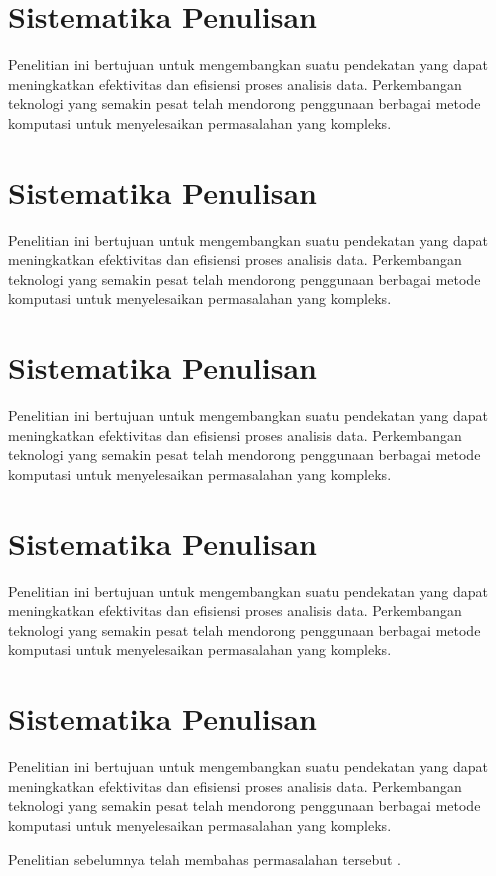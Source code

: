 \section{Sistematika Penulisan}
Penelitian ini bertujuan untuk mengembangkan suatu pendekatan yang dapat meningkatkan efektivitas dan efisiensi proses analisis data. Perkembangan teknologi yang semakin pesat telah mendorong penggunaan berbagai metode komputasi untuk menyelesaikan permasalahan yang kompleks.

\section{Sistematika Penulisan}
Penelitian ini bertujuan untuk mengembangkan suatu pendekatan yang dapat meningkatkan efektivitas dan efisiensi proses analisis data. Perkembangan teknologi yang semakin pesat telah mendorong penggunaan berbagai metode komputasi untuk menyelesaikan permasalahan yang kompleks.

\section{Sistematika Penulisan}
Penelitian ini bertujuan untuk mengembangkan suatu pendekatan yang dapat meningkatkan efektivitas dan efisiensi proses analisis data. Perkembangan teknologi yang semakin pesat telah mendorong penggunaan berbagai metode komputasi untuk menyelesaikan permasalahan yang kompleks.

\section{Sistematika Penulisan}
Penelitian ini bertujuan untuk mengembangkan suatu pendekatan yang dapat meningkatkan efektivitas dan efisiensi proses analisis data. Perkembangan teknologi yang semakin pesat telah mendorong penggunaan berbagai metode komputasi untuk menyelesaikan permasalahan yang kompleks.

\section{Sistematika Penulisan}
Penelitian ini bertujuan untuk mengembangkan suatu pendekatan yang dapat meningkatkan efektivitas dan efisiensi proses analisis data. Perkembangan teknologi yang semakin pesat telah mendorong penggunaan berbagai metode komputasi untuk menyelesaikan permasalahan yang kompleks.

Penelitian sebelumnya telah membahas permasalahan tersebut
\parencite{neuman1980}.

